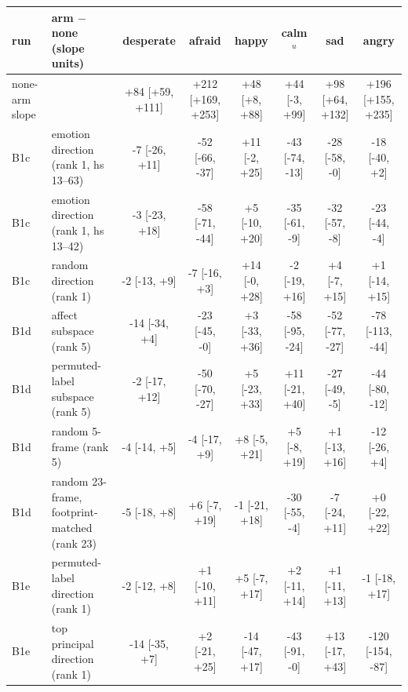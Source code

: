 \begin{tabular}{llcccccc}
\toprule
run & arm $-$ none (slope units) & desperate & afraid & happy & calm$^{u}$ & sad & angry \\
\midrule
none-arm slope & & +84 [+59, +111] & +212 [+169, +253] & +48 [+8, +88] & +44 [-3, +99] & +98 [+64, +132] & +196 [+155, +235] \\
\midrule
B1c & emotion direction (rank 1, hs 13--63) & -7 [-26, +11] & -52 [-66, -37] & +11 [-2, +25] & -43 [-74, -13] & -28 [-58, -0] & -18 [-40, +2] \\
B1c & emotion direction (rank 1, hs 13--42) & -3 [-23, +18] & -58 [-71, -44] & +5 [-10, +20] & -35 [-61, -9] & -32 [-57, -8] & -23 [-44, -4] \\
B1c & random direction (rank 1) & -2 [-13, +9] & -7 [-16, +3] & +14 [-0, +28] & -2 [-19, +16] & +4 [-7, +15] & +1 [-14, +15] \\
B1d & affect subspace (rank 5) & -14 [-34, +4] & -23 [-45, -0] & +3 [-33, +36] & -58 [-95, -24] & -52 [-77, -27] & -78 [-113, -44] \\
B1d & permuted-label subspace (rank 5) & -2 [-17, +12] & -50 [-70, -27] & +5 [-23, +33] & +11 [-21, +40] & -27 [-49, -5] & -44 [-80, -12] \\
B1d & random 5-frame (rank 5) & -4 [-14, +5] & -4 [-17, +9] & +8 [-5, +21] & +5 [-8, +19] & +1 [-13, +16] & -12 [-26, +4] \\
B1d & random 23-frame, footprint-matched (rank 23) & -5 [-18, +8] & +6 [-7, +19] & -1 [-21, +18] & -30 [-55, -4] & -7 [-24, +11] & +0 [-22, +22] \\
B1e & permuted-label direction (rank 1) & -2 [-12, +8] & +1 [-10, +11] & +5 [-7, +17] & +2 [-11, +14] & +1 [-11, +13] & -1 [-18, +17] \\
B1e & top principal direction (rank 1) & -14 [-35, +7] & +2 [-21, +25] & -14 [-47, +17] & -43 [-91, -0] & +13 [-17, +43] & -120 [-154, -87] \\
\bottomrule
\end{tabular}
